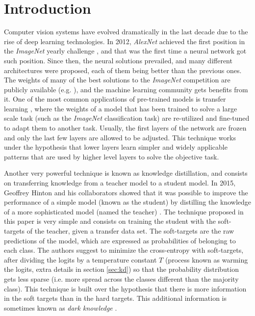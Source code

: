\documentclass{elsarticle}
\begin{document}
	\section{Introduction}
	Computer vision systems have evolved dramatically in the last decade due to the rise of deep learning technologies. In 2012, \textit{AlexNet} \citep{krizhevsky2012} achieved the first position in the \textit{ImageNet} yearly challenge \citep{ILSVRC15}, and that was the first time a neural network got such position. Since then, the neural solutions prevailed, and many different architectures were proposed, each of them being better than the previous ones. The weights of many of the best solutions to the \textit{ImageNet} competition are publicly available (e.g. \cite{he2016, chollet2017, szegedy2016, szegedy2017, howard2017, pham2018, tan2019}), and the machine learning community gets benefits from it. One of the most common applications of pre-trained models is transfer learning \citep{zhuang2021}, where the weights of a model that has been trained to solve a large scale task (such as the \textit{ImageNet} classification task) are re-utilized and fine-tuned to adapt them to another task. Usually, the first layers of the network are frozen and only the last few layers are allowed to be adjusted. This technique works under the hypothesis that lower layers learn simpler and widely applicable patterns that are used by higher level layers to solve the objective task.

	Another very powerful technique is known as knowledge distillation, and consists on transferring knowledge from a teacher model to a student model. In 2015, Geoffrey Hinton and his collaborators showed that it was possible to improve the performance of a simple model (known as the student) by distilling the knowledge of a more sophisticated model (named the teacher) \citep{hinton2015}. The technique proposed in this paper is very simple and consists on training the student with the soft-targets of the teacher, given a transfer data set. The soft-targets are the raw predictions of the model, which are expressed as probabilities of belonging to each class. The authors suggest to minimize the cross-entropy with soft-targets, after dividing the logits by a temperature constant $T$ (process known as warming the logits, extra details in section \ref{sec:kd}) so that the probability distribution gets less sparse (i.e. more spread across the classes different than the majority class). This technique is built over the hypothesis that there is more information in the soft targets than in the hard targets. This additional information is sometimes known as \textit{dark knowledge} \citep{gou2020}.
\end{document}
